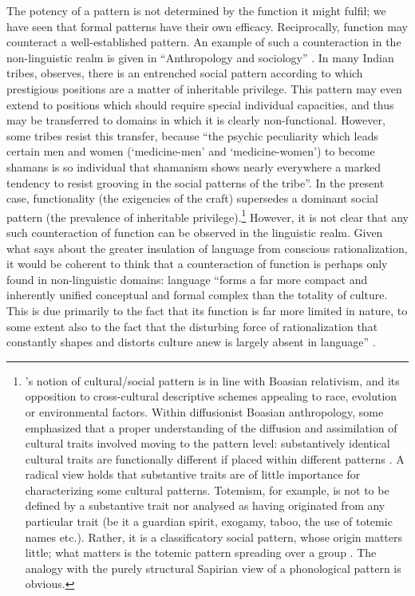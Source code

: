 \documentclass[output=paper]{langscibook}
\begin{document}
The potency of a pattern is not determined by the function it might fulfil; we have seen that formal patterns have their own efficacy. Reciprocally, function may counteract a well-established pattern. An example of such a counteraction in the non-linguistic realm is given in ``Anthropology and sociology'' \citep{Sapir1927a}. In many Indian tribes, {\Sapir} observes, there is an entrenched social pattern according to which prestigious positions are a matter of inheritable privilege. This pattern may even extend to positions which should require special individual capacities, and thus may be transferred to domains in which it is clearly non-functional. However, some tribes resist this transfer, because ``the psychic peculiarity which leads certain men and women (`medicine-men' and `medicine-women') to become shamans is so individual that shamanism shows nearly everywhere a marked tendency to resist grooving in the social patterns of the tribe''. In the present case, functionality (the exigencies of the craft) supersedes a dominant social pattern (the prevalence of inheritable privilege).\footnote{{\Sapir}'s notion of cultural/social pattern is in line with Boasian relativism, and its opposition to cross-cultural descriptive schemes appealing to race, evolution or environmental factors. Within diffusionist Boasian anthropology, some emphasized that a proper understanding of the diffusion and assimilation of cultural traits involved moving to the pattern level: substantively identical cultural traits are functionally different if placed within different patterns \citep{Wissler1917}. A radical view holds that substantive traits are of little importance for characterizing some cultural patterns. Totemism, for example, is not to be defined by a substantive trait nor analysed as having originated from any particular trait (be it a guardian spirit, exogamy, taboo, the use of totemic names etc.). Rather, it is a classificatory social pattern, whose origin matters little; what matters is the totemic pattern spreading over a group \citep{Goldenweiser1912}. The analogy with the purely structural Sapirian view of a phonological pattern is obvious.} However, it is not clear that any such counteraction of function can be observed in the linguistic realm. Given what {\Sapir} says about the greater insulation of language from conscious rationalization, it would be coherent to think that a counteraction of function is perhaps only found in non-linguistic domains: language ``forms a far more compact and inherently unified conceptual and formal complex than the totality of culture. This is due primarily to the fact that its function is far more limited in nature, to some extent also to the fact that the disturbing force of rationalization that constantly shapes and distorts culture anew is largely absent in language'' \citep[432--433]{Sapir1916}. 
\end{document}
